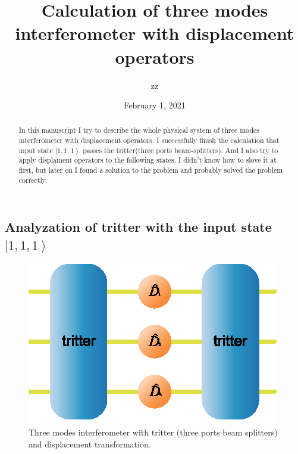 \documentclass[%
 reprint,
 amsmath,amssymb,
 aps,
onecolumn
]{revtex4-2}
\begin{document}
\allowdisplaybreaks[1]

\title{Calculation of three modes interferometer with displacement 
operators}

\author{zz}


\date{February 1, 2021}

\begin{abstract}
In this manuscript I try to describe the whole physical system of 
three modes interferometer with displacement operators. I successfully
finish the calculation that input state $ \left |1,1,1 \right \rangle $
passes the tritter(three ports beam-splitters). And I also try to apply
displament operators to the following states. I didn't know how to 
slove it at first, but later on I found a solution to the problem and
probably solved the problem correctly.
\end{abstract}

\maketitle






\subsection{Analyzation of tritter with the input state $\left|1,1,1\right\rangle$}

\begin{figure}[h]
  \includegraphics{image/triMZI.eps}
  \caption{\label{fig:triMZI} Three modes interferometer with tritter
  (three ports beam splitters) and displacement transformation.}
\end{figure}
\end{document}
